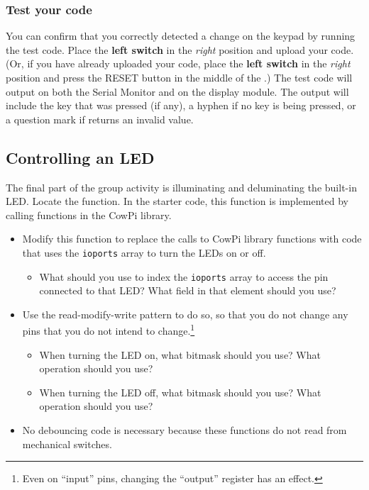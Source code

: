 \subsubsection*{Test your code}

You can confirm that you correctly detected a change on the keypad by running the test code.
Place the \textbf{left switch} in the \textit{right} position and upload your code.
(Or, if you have already uploaded your code, place the \textbf{left switch} in the \textit{right} position and press the RESET button in the middle of the \developmentboard.)
The test code will output on both the Serial Monitor and on the display module.
The output will include the key that was pressed (if any), a hyphen if no key is being pressed, or a question mark if  returns an invalid value.


\subsection{Controlling an LED} \label{subsec:controlLED}

The final part of the group activity is illuminating and deluminating the built-in LED\@.
Locate the  function.
In the starter code, this function is implemented by calling functions in the CowPi library.

\begin{itemize}
    \item Modify this function to replace the calls to CowPi library functions with code that uses the \lstinline{ioports} array to turn the LEDs on or off.
        \begin{itemize}
            \item What should you use to index the \lstinline{ioports} array to access the pin connected to that LED?
                What field in that element should you use?
        \end{itemize}
    \item Use the read-modify-write pattern to do so, so that you do not change any pins that you do not intend to change.\footnote{Even on ``input'' pins, changing the ``output'' register has an effect.}
    \begin{itemize}
        \item When turning the LED on, what bitmask should you use?
            What operation should you use?
        \item When turning the LED off, what bitmask should you use?
            What operation should you use?
    \end{itemize}
    \item No debouncing code is necessary because these functions do not read from mechanical switches.
\end{itemize}


